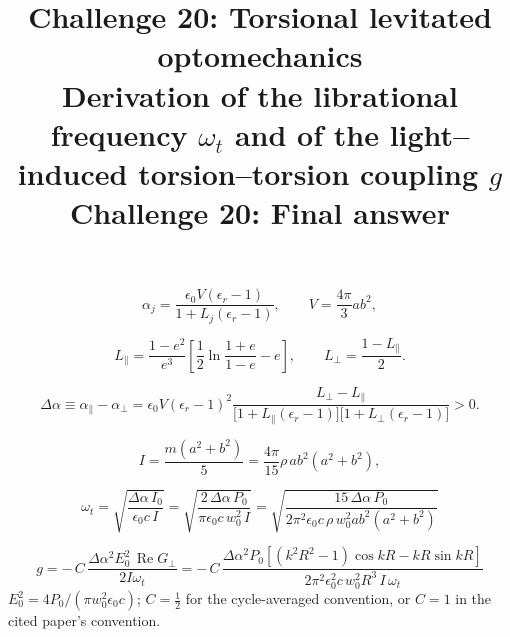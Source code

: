 \documentclass[11pt,a4paper]{article}
\title{\bfseries Challenge 20: Torsional levitated optomechanics\\[2pt]
\large Derivation of the librational frequency $\omega_t$ and of the
light--induced torsion--torsion coupling $g$}
\author{}
\date{}
\title{Challenge 20: Final answer}
\author{}
\newcommand{\dalpha}{\Delta\alpha}
\newcommand{\ReG}{\operatorname{Re}G_{\perp}}
\begin{document}
\maketitle
\begin{equation}
  \alpha_j=\frac{\epsilon_0V(\epsilon_r-1)}{1+L_j(\epsilon_r-1)},
  \qquad V=\frac{4\pi}{3}ab^{2},
  \label{eq:alpha}
\end{equation}

\begin{equation}
  L_{\parallel}=\frac{1-e^{2}}{e^{3}}
  \left[\frac{1}{2}\ln\!\frac{1+e}{1-e}-e\right],
  \qquad
  L_{\perp}=\frac{1-L_{\parallel}}{2}.
  \label{eq:L}
\end{equation}

\begin{equation}
  \dalpha\equiv\alpha_{\parallel}-\alpha_{\perp}
  =\epsilon_0V(\epsilon_r-1)^{2}
   \frac{L_{\perp}-L_{\parallel}}
        {\bigl[1+L_{\parallel}(\epsilon_r-1)\bigr]
         \bigl[1+L_{\perp}(\epsilon_r-1)\bigr]}>0 .
  \label{eq:dalpha}
\end{equation}

\begin{equation}
  I=\frac{m\left(a^{2}+b^{2}\right)}{5}
   =\frac{4\pi}{15}\rho\,ab^{2}\left(a^{2}+b^{2}\right),
  \label{eq:inertia}
\end{equation}

\begin{equation}
  \boxed{\;
  \omega_t=\sqrt{\frac{\dalpha\,I_0}{\epsilon_0 c\,I}}
         =\sqrt{\frac{2\,\dalpha\,P_0}{\pi\epsilon_0 c\,w_0^{2}\,I}}
         =\sqrt{\frac{15\,\dalpha\,P_0}
                     {2\pi^{2}\epsilon_0c\,\rho\,w_0^{2}ab^{2}(a^{2}+b^{2})}}\;}
  \label{eq:omegat}
\end{equation}

\begin{equation}
  \boxed{\;
  g=-\,C\,\frac{\dalpha^{2}E_0^{2}\,\ReG}{2I\omega_t}
   =-\,C\,\frac{\dalpha^{2}P_0
     \left[\left(k^{2}R^{2}-1\right)\cos kR-kR\sin kR\right]}
     {2\pi^{2}\epsilon_0^{2}c\,w_0^{2}R^{3}\,I\,\omega_t}\;}
  \label{eq:g}
\end{equation}
$E_0^2=4P_0/(\pi w_0^2\epsilon_0c)$; $C=\tfrac12$ for the cycle-averaged convention, or $C=1$ in the cited paper's convention.
\end{document}
